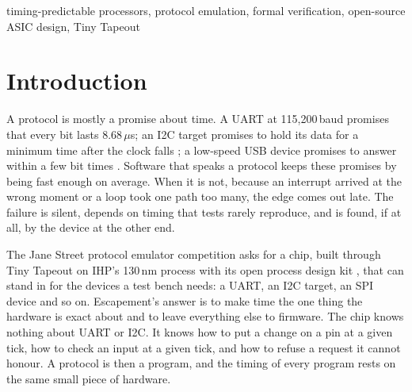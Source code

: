 \documentclass[conference,letterpaper]{IEEEtran}
\begin{document}
\begin{IEEEkeywords}
timing-predictable processors, protocol emulation, formal verification, open-source ASIC
design, Tiny Tapeout
\end{IEEEkeywords}

\section{Introduction}

A protocol is mostly a promise about time. A UART at 115{,}200\,baud promises that every
bit lasts 8.68\,$\mu$s; an I2C target promises to hold its data for a minimum time after
the clock falls \cite{i2c}; a low-speed USB device promises to answer within a few bit
times \cite{usb20}. Software that speaks a protocol keeps these promises by being fast
enough on average. When it is not, because an interrupt arrived at the wrong moment or a
loop took one path too many, the edge comes out late. The failure is silent, depends on
timing that tests rarely reproduce, and is found, if at all, by the device at the other
end.

The Jane Street protocol emulator competition \cite{janestreet} asks for a chip, built
through Tiny Tapeout \cite{tinytapeout} on IHP's 130\,nm process with its open process
design kit \cite{ihppdk}, that
can stand in for the devices a test bench needs: a UART, an I2C target, an SPI device and
so on. Escapement's answer is to make time the one thing the hardware is exact about and
to leave everything else to firmware. The chip knows nothing about UART or I2C. It knows
how to put a change on a pin at a given tick, how to check an input at a given tick, and
how to refuse a request it cannot honour. A protocol is then a program, and the timing
of every program rests on the same small piece of hardware.
\end{document}
